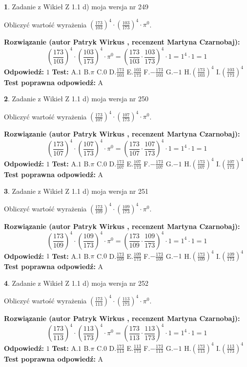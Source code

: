\documentclass[12pt, a4paper]{article}
\theoremstyle{definition} %
\newtheorem{zad}{}
\newcommand{\zadStart}[1]{\begin{zad}#1\newline}
\newcommand{\zadStop}{\end{zad}}
\newcommand{\rozwStart}[2]{\noindent \textbf{Rozwiązanie (autor #1 , recenzent #2): }\newline}
\newcommand{\rozwStop}{\newline}
\newcommand{\odpStart}{\noindent \textbf{Odpowiedź:}\newline}
\newcommand{\odpStop}{\newline}
\newcommand{\testStart}{\noindent \textbf{Test:}\newline}
\newcommand{\testStop}{\newline}
\newcommand{\kluczStart}{\noindent \textbf{Test poprawna odpowiedź:}\newline}
\newcommand{\kluczStop}{\newline}
\begin{document}
\zadStart{Zadanie z Wikieł Z 1.1 d) moja wersja nr 249}

Obliczyć wartość wyrażenia $(\frac{173}{103})^{4} \cdot (\frac{103}{173})^{4} \cdot \pi^{0}$.
\zadStop
\rozwStart{Patryk Wirkus}{Martyna Czarnobaj}
$$(\frac{173}{103})^{4} \cdot (\frac{103}{173})^{4} \cdot \pi^{0} = (\frac{173}{103} \cdot \frac{103}{173})^{4} \cdot 1 = 1^{4} \cdot 1 = 1$$
\rozwStop
\odpStart
$1$
\odpStop
\testStart
A.$1$ B.$\pi$ C.$0$ D.$\frac{173}{103}$ E.$\frac{103}{173}$
F.$-\frac{173}{103}$ G.$-1$
H.$(\frac{173}{103})^{4}$
I.$(\frac{103}{173})^{4}$
\testStop
\kluczStart
A
\kluczStop



\zadStart{Zadanie z Wikieł Z 1.1 d) moja wersja nr 250}

Obliczyć wartość wyrażenia $(\frac{173}{107})^{4} \cdot (\frac{107}{173})^{4} \cdot \pi^{0}$.
\zadStop
\rozwStart{Patryk Wirkus}{Martyna Czarnobaj}
$$(\frac{173}{107})^{4} \cdot (\frac{107}{173})^{4} \cdot \pi^{0} = (\frac{173}{107} \cdot \frac{107}{173})^{4} \cdot 1 = 1^{4} \cdot 1 = 1$$
\rozwStop
\odpStart
$1$
\odpStop
\testStart
A.$1$ B.$\pi$ C.$0$ D.$\frac{173}{107}$ E.$\frac{107}{173}$
F.$-\frac{173}{107}$ G.$-1$
H.$(\frac{173}{107})^{4}$
I.$(\frac{107}{173})^{4}$
\testStop
\kluczStart
A
\kluczStop



\zadStart{Zadanie z Wikieł Z 1.1 d) moja wersja nr 251}

Obliczyć wartość wyrażenia $(\frac{173}{109})^{4} \cdot (\frac{109}{173})^{4} \cdot \pi^{0}$.
\zadStop
\rozwStart{Patryk Wirkus}{Martyna Czarnobaj}
$$(\frac{173}{109})^{4} \cdot (\frac{109}{173})^{4} \cdot \pi^{0} = (\frac{173}{109} \cdot \frac{109}{173})^{4} \cdot 1 = 1^{4} \cdot 1 = 1$$
\rozwStop
\odpStart
$1$
\odpStop
\testStart
A.$1$ B.$\pi$ C.$0$ D.$\frac{173}{109}$ E.$\frac{109}{173}$
F.$-\frac{173}{109}$ G.$-1$
H.$(\frac{173}{109})^{4}$
I.$(\frac{109}{173})^{4}$
\testStop
\kluczStart
A
\kluczStop



\zadStart{Zadanie z Wikieł Z 1.1 d) moja wersja nr 252}

Obliczyć wartość wyrażenia $(\frac{173}{113})^{4} \cdot (\frac{113}{173})^{4} \cdot \pi^{0}$.
\zadStop
\rozwStart{Patryk Wirkus}{Martyna Czarnobaj}
$$(\frac{173}{113})^{4} \cdot (\frac{113}{173})^{4} \cdot \pi^{0} = (\frac{173}{113} \cdot \frac{113}{173})^{4} \cdot 1 = 1^{4} \cdot 1 = 1$$
\rozwStop
\odpStart
$1$
\odpStop
\testStart
A.$1$ B.$\pi$ C.$0$ D.$\frac{173}{113}$ E.$\frac{113}{173}$
F.$-\frac{173}{113}$ G.$-1$
H.$(\frac{173}{113})^{4}$
I.$(\frac{113}{173})^{4}$
\testStop
\kluczStart
A
\kluczStop
\end{document}
